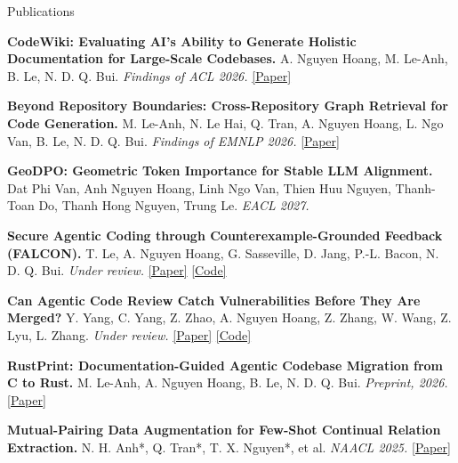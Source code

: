 \documentclass{resume} %
\begin{document}
\begin{rSection}{Publications}

\begin{enumerate}[leftmargin=1.8em,label={[\arabic*]},itemsep=0em,topsep=0.1em]

    \item \textbf{CodeWiki: Evaluating AI's Ability to Generate Holistic
    Documentation for Large-Scale Codebases.}
    A. Nguyen Hoang, M. Le-Anh, B. Le, N. D. Q. Bui.
    \textit{Findings of ACL 2026.}
    \href{https://arxiv.org/abs/2510.24428}{[Paper]}

    \item \textbf{Beyond Repository Boundaries: Cross-Repository Graph
    Retrieval for Code Generation.}
    M. Le-Anh, N. Le Hai, Q. Tran, A. Nguyen Hoang, L. Ngo Van, B. Le,
    N. D. Q. Bui.
    \textit{Findings of EMNLP 2026.}
    \href{https://arxiv.org/abs/2609.09987}{[Paper]}

    \item \textbf{GeoDPO: Geometric Token Importance for Stable LLM Alignment.}
    Dat Phi Van, Anh Nguyen Hoang, Linh Ngo Van, Thien Huu Nguyen,
    Thanh-Toan Do, Thanh Hong Nguyen, Trung Le.
    \textit{EACL 2027.}

    \item \textbf{Secure Agentic Coding through Counterexample-Grounded
    Feedback (FALCON).}
    T. Le, A. Nguyen Hoang, G. Sasseville, D. Jang, P.-L. Bacon, N. D. Q. Bui.
    \textit{Under review.}
    \href{https://arxiv.org/abs/2610.25916}{[Paper]}
    \href{https://github.com/FSoft-AI4Code/FALCON}{[Code]}

    \item \textbf{Can Agentic Code Review Catch Vulnerabilities Before They
    Are Merged?}
    Y. Yang, C. Yang, Z. Zhao, A. Nguyen Hoang, Z. Zhang, W. Wang, Z. Lyu,
    L. Zhang.
    \textit{Under review.}
    \href{https://secprbench.github.io/paper.pdf}{[Paper]}
    \href{https://github.com/secprbench/secprbench}{[Code]}

    \item \textbf{RustPrint: Documentation-Guided Agentic Codebase Migration
    from C to Rust.}
    M. Le-Anh, A. Nguyen Hoang, B. Le, N. D. Q. Bui.
    \textit{Preprint, 2026.}
    \href{https://arxiv.org/abs/2605.14634}{[Paper]}

    \item \textbf{Mutual-Pairing Data Augmentation for Few-Shot Continual
    Relation Extraction.}
    N. H. Anh*, Q. Tran*, T. X. Nguyen*, et al.
    \textit{NAACL 2025.}
    \href{https://aclanthology.org/2025.naacl-long.205/}{[Paper]}


\end{enumerate}
\end{rSection}
\end{document}
